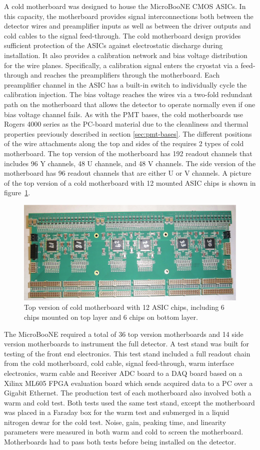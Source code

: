 A cold motherboard was designed to house the MicroBooNE CMOS ASICs. In this capacity, the motherboard provides signal interconnections both between the detector wires and preamplifier inputs as well as between the driver outputs and cold cables to the signal feed-through. The cold motherboard design provides sufficient protection of the ASICs against electrostatic discharge during installation. It also provides a calibration network and bias voltage distribution for the wire planes. Specifically, a calibration signal enters the cryostat via a feed-through and reaches the preamplifiers through the motherboard. Each preamplifier channel in the ASIC has a built-in switch to individually cycle the calibration injection. The bias voltage reaches the \lartpc wires via a two-fold redundant path on the motherboard that allows the detector to operate normally even if one bias voltage channel fails.  As with the PMT bases, the cold motherboards use Rogers 4000 series as the PC-board material due to the cleanliness and thermal properties previously described in section \ref{sec:pmt-bases}.  The different positions of the wire attachments along the top and sides of the \lartpc requires 2 types of cold motherboard. The top version of the motherboard has 192 readout channels that includes 96 Y channels, 48 U channels, and 48 V channels. The side version of the motherboard has 96 readout channels that are either U or V channels. A picture of the top version of a cold motherboard with 12 mounted ASIC chips is shown in figure~\ref{fig:figmb}. 

\begin{figure}[hbt]
\centering
\includegraphics[width=0.75\linewidth]{figures/mb2.pdf}
\caption{\label{fig:figmb} Top version of cold motherboard with 12 ASIC chips, including 6 chips mounted on top layer and 6 chips on bottom layer.}
\end{figure}


The MicroBooNE \lartpc required a total of 36 top version motherboards and 14 side version motherboards to instrument the full detector. A test stand was built for testing of the front end electronics. This test stand included a full readout chain from the cold motherboard, cold cable, signal feed-through, warm interface electronics, warm cable and Receiver ADC board to a DAQ board based on a Xilinx ML605 FPGA evaluation board which sends acquired data to a PC over a Gigabit Ethernet. The production test of each motherboard also involved both a warm and cold test. Both tests used the same test stand, except the motherboard was placed in a Faraday box for the warm test and submerged in a liquid nitrogen dewar for the cold test. Noise, gain, peaking time, and linearity parameters were measured in both warm and cold to screen the motherboard. Motherboards had to pass both tests  before being installed on the detector.

